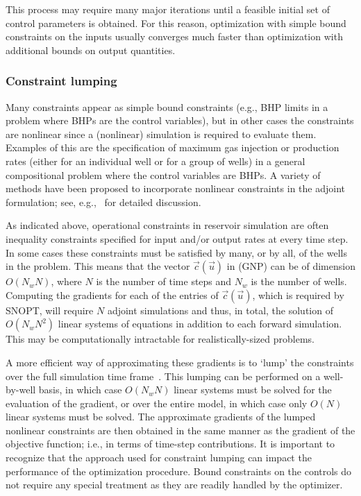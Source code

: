 \documentclass[twocolumn,numbook]{svjour3}          %
\def\u{{\vec u}}
\def\c{{\vec c}}
\begin{document}
This process may require many major iterations until a feasible initial set of control parameters
is obtained. For this reason, optimization with simple bound constraints on 
the inputs usually converges much faster than optimization with additional bounds
on output quantities.

\subsubsection{Constraint lumping}

Many constraints appear as simple bound constraints (e.g., BHP limits in a problem where BHPs are the control variables), but in other cases the constraints are nonlinear since a (nonlinear) simulation is required to evaluate them. Examples of this are the specification of maximum 
gas injection or production rates (either for an individual well or for a group of wells) in a 
general compositional problem where the control variables are BHPs. A variety of methods have been proposed to incorporate nonlinear constraints in the adjoint formulation; see,
e.g.,~\cite{Pallav:2006,Jansen:2011,Suwartadi:2012,Chen:2010} for detailed discussion.
 
As indicated above, operational constraints in reservoir simulation are often inequality constraints specified for input and/or output rates at every time step. In some cases these constraints must be satisfied by many, or by all, of the wells in the problem.
This means that the vector $\c(\u)$ in (GNP) can be of dimension $O(N_w N)$, where $N$ is the number of time steps and $N_w$ is the number of wells. Computing the gradients
for each of the entries of $\c(\u)$, which is required by SNOPT, will require $N$ adjoint simulations and thus, in total, the solution of $O(N_w N^2)$ linear systems of equations in addition to each forward simulation. This may be
computationally intractable for realistically-sized problems.

A more efficient way of approximating these gradients 
is to `lump' the constraints over the full simulation time frame~\cite{Pallav:2008}. 
This lumping can be performed on a well-by-well basis, in which case $O(N_w N)$ linear systems 
must be solved for the evaluation of the gradient, or over the entire model, in which case only $O(N)$ linear systems must be solved. The approximate gradients of the lumped
nonlinear constraints are then obtained in the same manner as the gradient of the
objective function; i.e., in terms of time-step contributions. It is important to recognize that the approach used for constraint lumping can impact the performance of the optimization procedure. Bound constraints on the controls do not require any special treatment as they are readily handled by the optimizer.
\end{document}
